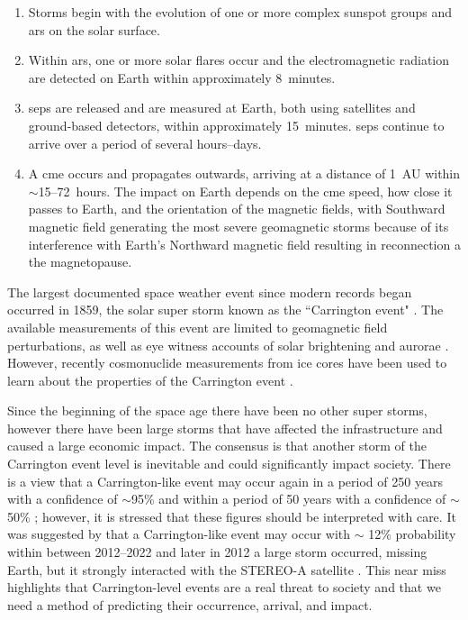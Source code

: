 \begin{enumerate}
	\item{Storms begin with the evolution of one or more complex sunspot groups and \glspl{ar} on the solar surface.}
	
	\item{Within \glspl{ar}, one or more solar flares occur and the electromagnetic radiation are detected on Earth within approximately 8~minutes.}
	
	\item{\glspl{sep} are released and are measured at Earth, both using satellites and ground-based detectors, within approximately 15~minutes. \glspl{sep} continue to arrive over a period of several hours--days.}
	
	\item{A \gls{cme} occurs and propagates outwards, arriving at a distance of 1~AU within $\sim$15--72~hours. The impact on Earth depends on the \gls{cme} speed, how close it passes to Earth, and the orientation of the magnetic fields, with Southward magnetic field generating the most severe geomagnetic storms because of its interference with Earth's Northward magnetic field resulting in reconnection a the magnetopause.}
	
\end{enumerate}

The largest documented space weather event since modern records began occurred in 1859, the solar super storm known as the ``Carrington event" \citep{carrington_description_1859}. The available measurements of this event are limited to geomagnetic field perturbations, as well as eye witness accounts of solar brightening and aurorae \citep{cannon_extreme_2013}. However, recently cosmonuclide measurements from ice cores have been used to learn about the properties of the Carrington event \citep{riley_probability_2012}.%

Since the beginning of the space age there have been no other super storms, however there have been large storms that have affected the infrastructure and caused a large economic impact. The consensus is that another storm of the Carrington event level is inevitable and could significantly impact society. There is a view that a Carrington-like event may occur again in a period of 250 years with a confidence of $\sim$95\% and within a period of 50 years with a confidence of $\sim$50\% \citep{cannon_extreme_2013}; however, it is stressed that these figures should be interpreted with care. It was suggested by \cite{riley_probability_2012} that a Carrington-like event may occur with $\sim$ 12\% probability within between 2012--2022 and later in 2012 a large storm occurred, missing Earth, but it strongly interacted with the STEREO-A satellite \citep{russell_very_2013}. This near miss highlights that Carrington-level events are a real threat to society and that we need a method of predicting their occurrence, arrival, and impact.



